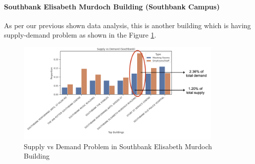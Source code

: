 \paragraph{Southbank Elisabeth Murdoch Building (Southbank Campus)}

As per our previous shown data analysis, this is another building which is having supply-demand problem as shown in the Figure \ref{fig:southbank_mr_s_vs_d}. 

\begin{figure}[H]
\centering
\includegraphics[width=10cm,keepaspectratio=true]{resources/images/spatial-mr/southbank-mr/southbank_01.png}
\caption{Supply vs Demand Problem in Southbank Elisabeth Murdoch Building}
\label{fig:southbank_mr_s_vs_d}
\end{figure}


